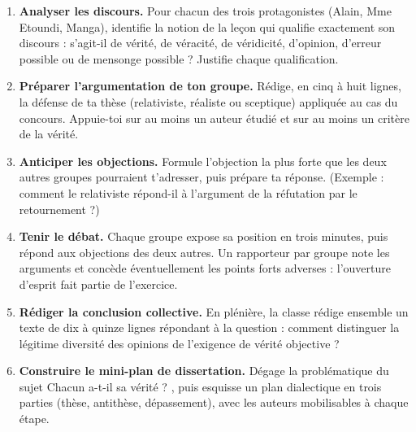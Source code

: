 \documentclass[11pt]{article}
\newcounter{popsec}
\newcounter{popsub}
\newcommand{\courssub}[1]{%
  \stepcounter{popsub}%
  \par\vspace{9pt}\noindent{\popxbold\fontsize{11.5}{13}\selectfont\color{popink}{\color{poporange}\thepopsec.\thepopsub}\hspace{6pt}#1}\par\nopagebreak\vspace{4pt}
}
\begin{document}
\begin{enumerate}
\item \textbf{Analyser les discours.} Pour chacun des trois protagonistes (Alain, Mme Etoundi, Manga), identifie la notion de la leçon qui qualifie exactement son discours : s'agit-il de vérité, de véracité, de véridicité, d'opinion, d'erreur possible ou de mensonge possible ? Justifie chaque qualification.
\item \textbf{Préparer l'argumentation de ton groupe.} Rédige, en cinq à huit lignes, la défense de ta thèse (relativiste, réaliste ou sceptique) appliquée au cas du concours. Appuie-toi sur au moins un auteur étudié et sur au moins un critère de la vérité.
\item \textbf{Anticiper les objections.} Formule l'objection la plus forte que les deux autres groupes pourraient t'adresser, puis prépare ta réponse. (Exemple : comment le relativiste répond-il à l'argument de la réfutation par le retournement ?)
\item \textbf{Tenir le débat.} Chaque groupe expose sa position en trois minutes, puis répond aux objections des deux autres. Un rapporteur par groupe note les arguments et concède éventuellement les points forts adverses : l'ouverture d'esprit fait partie de l'exercice.
\item \textbf{Rédiger la conclusion collective.} En plénière, la classe rédige ensemble un texte de dix à quinze lignes répondant à la question : comment distinguer la légitime diversité des opinions de l'exigence de vérité objective ?
\item \textbf{Construire le mini-plan de dissertation.} Dégage la problématique du sujet \guillemotleft Chacun a-t-il sa vérité ? \guillemotright, puis esquisse un plan dialectique en trois parties (thèse, antithèse, dépassement), avec les auteurs mobilisables à chaque étape.
\end{enumerate}

\courssub{Ressources à mobiliser}
\end{document}

